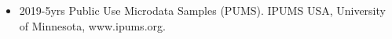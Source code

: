 \begin{itemize}
\item 2019-5yrs Public Use Microdata Samples (PUMS). IPUMS USA, University of Minnesota, www.ipums.org.
\end{itemize}
